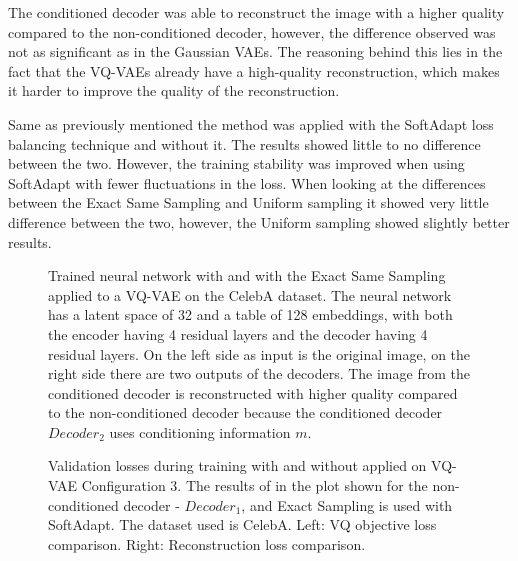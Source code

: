 The conditioned decoder was able to reconstruct the image with a higher quality compared to the non-conditioned decoder, however, the difference observed was not as significant as in the Gaussian VAEs. The reasoning behind this lies in the fact that the VQ-VAEs already have a high-quality reconstruction, which makes it harder to improve the quality of the reconstruction.

Same as previously mentioned the method was applied with the SoftAdapt loss balancing technique and without it. The results showed little to no difference between the two. However, the training stability was improved when using SoftAdapt with fewer fluctuations in the loss. When looking at the differences between the Exact Same Sampling and Uniform sampling it showed very little difference between the two, however, the Uniform sampling showed slightly better results.

\begin{figure}[H]
    \centering
    
    \caption[Trained neural network with  applied to a VQ-VAE.]
    {
        Trained neural network with  and with the Exact Same Sampling applied to a VQ-VAE on the CelebA dataset. The neural network has a latent space of 32 and a table of 128 embeddings, with both the encoder having 4 residual layers and the decoder having 4 residual layers.
        On the left side as input is the original image, on the right side there are two outputs of the decoders. 
        The image from the conditioned decoder is reconstructed with higher quality compared to the non-conditioned decoder because the conditioned decoder $Decoder_2$ uses conditioning information $m$.
    }
    \label{fig:res_val_vqvae}
\end{figure}

\begin{figure}[H]
    \centering
    \scalebox{0.48}{}
    \scalebox{0.48}{}
    \caption[Validation loss comparison during training of a Gaussian VAE.]
    {
        Validation losses during training with and without  applied on VQ-VAE Configuration 3. The results of  in the plot shown for the non-conditioned decoder - $Decoder_1$, and Exact Sampling is used with SoftAdapt. The dataset used is CelebA.
        Left: VQ objective loss comparison. Right: Reconstruction loss comparison.
    }
    \label{fig:results_method1_vq_vae}
\end{figure}

